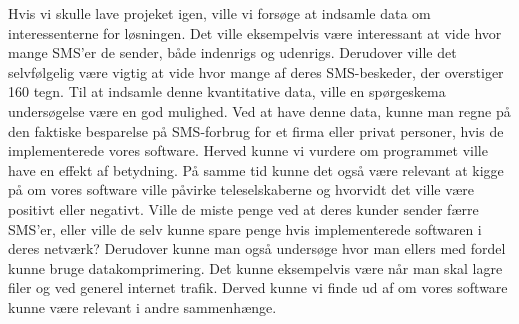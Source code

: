 Hvis vi skulle lave projeket igen, ville vi forsøge at indsamle data om interessenterne for løsningen. Det ville eksempelvis være interessant at vide hvor mange SMS'er de sender, både indenrigs og udenrigs. Derudover ville det selvfølgelig være vigtig at vide hvor mange af deres SMS-beskeder, der overstiger 160 tegn. Til at indsamle denne kvantitative data, ville en spørgeskema undersøgelse være en god mulighed. Ved at have denne data, kunne man regne på den faktiske besparelse på SMS-forbrug for et firma eller privat personer, hvis de implementerede vores software. Herved kunne vi vurdere om programmet ville have en effekt af betydning. 
På samme tid kunne det også være relevant at kigge på om vores software ville påvirke teleselskaberne og hvorvidt det ville være positivt eller negativt. Ville de miste penge ved at deres kunder sender færre SMS'er, eller ville de selv kunne spare penge hvis implementerede softwaren i deres netværk?
Derudover kunne man også undersøge hvor man ellers med fordel kunne bruge datakomprimering. Det kunne eksempelvis være når man skal lagre filer og ved generel internet trafik. Derved kunne vi finde ud af om vores software kunne være relevant i andre sammenhænge.

 